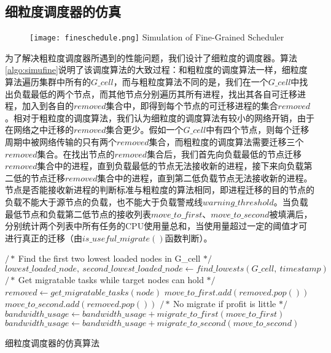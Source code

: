 \subsection{细粒度调度器的仿真}
\begin{figure}[!htp]
  \centering
  \texttt{[image: fineschedule.png]}
    {Simulation of Fine-Grained Scheduler}
  \label{fig:simufine}
\end{figure}
为了解决粗粒度调度器所遇到的性能问题，我们设计了细粒度的调度器。算法\ref{algo:simufine}说明了该调度算法的大致过程：和粗粒度的调度算法一样，细粒度算法遍历集群中所有的$G\_cell$，而与粗粒度算法不同的是，我们在一个$G\_cell$中找出负载最低的两个节点，而其他节点分别遍历其所有进程，找出其各自可迁移进程，加入到各自的$removed$集合中，即得到每个节点的可迁移进程的集合$removed$。相对于粗粒度的调度算法，我们认为细粒度的调度算法有较小的网络开销，由于在网络之中迁移的$removed$集合更少。假如一个$G\_cell$中有四个节点，则每个迁移周期中被网络传输的只有两个$removed$集合，而粗粒度的调度算法需要迁移三个$removed$集合。在找出节点的$removed$集合后，我们首先向负载最低的节点迁移$removed$集合中的进程，直到负载最低的节点无法接收新的进程，接下来向负载第二低的节点迁移$removed$集合中的进程，直到第二低负载节点无法接收新的进程。节点是否能接收新进程的判断标准与粗粒度的算法相同，即进程迁移的目的节点的负载不能大于源节点的负载，也不能大于负载警戒线$warning\_threshold$。当负载最低节点和负载第二低节点的接收列表$move\_to\_first$、$move\_to\_second$被填满后，分别统计两个列表中所有任务的CPU使用量总和，当使用量超过一定的阈值才可进行真正的迁移（由$is\_useful\_migrate()$函数判断）。
\begin{algorithm}[h]
\begin{algorithmic}[1]
\State $/*\ $Find the first two lowest loaded nodes in G\_cell $*/$
\State $lowest\_loaded\_node,\ second\_lowest\_loaded\_node \gets find\_lowests(G\_cell,\  timestamp)$
\State
{}
\State $/*\ $Get migratable tasks while target nodes can hold $*/$
\State $removed \gets get\_migratable\_tasks(node)$
\State $move\_to\_first.add(removed.pop())$
\EndWhile
{}
\State $move\_to\_second.add(removed.pop())$
\EndWhile
\State
\State $/*\ $No migrate if profit is little $*/$
\State $bandwidth\_usage \gets bandwidth\_usage + migrate\_to\_first(move\_to\_first)$
\EndIf
{}
\State $bandwidth\_usage \gets bandwidth\_usage + migrate\_to\_second(move\_to\_second)$
\EndIf
\EndFor
\EndFor
\EndFunction
\end{algorithmic}
\caption{细粒度调度器的仿真算法}
\label{algo:simufine}
\end{algorithm}

